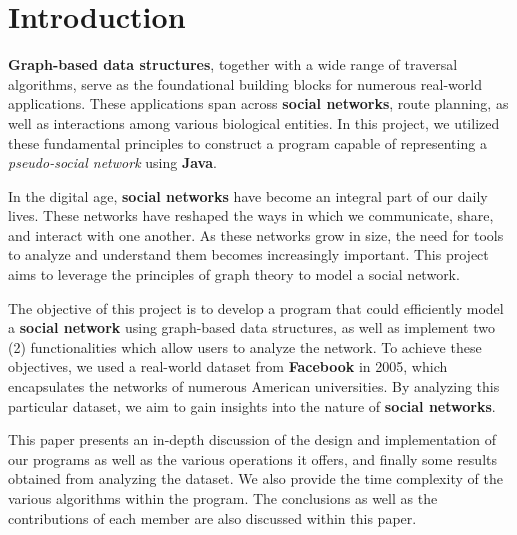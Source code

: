 \section*{\textbf{Introduction}}

\textbf{Graph-based data structures}, together with a wide range of traversal algorithms, serve as the foundational building blocks for numerous real-world applications. These applications span across \textbf{social networks}, route planning, as well as interactions among various biological entities. In this project, we utilized these fundamental principles to construct a program capable of representing a \textit{pseudo-social network} using \textbf{Java}.

In the digital age, \textbf{social networks} have become an integral part of our daily lives. These networks have reshaped the ways in which we communicate, share, and interact with one another. As these networks grow in size, the need for tools to analyze and understand them becomes increasingly important. This project aims to leverage the principles of graph theory to model a social network.

The objective of this project is to develop a program that could efficiently model a \textbf{social network} using graph-based data structures, as well as implement two (2) functionalities which allow users to analyze the network. To achieve these objectives, we used a real-world dataset from \textbf{Facebook} in 2005, which encapsulates the networks of numerous American universities. By analyzing this particular dataset, we aim to gain insights into the nature of \textbf{social networks}.

This paper presents an in-depth discussion of the design and implementation of our programs as well as the various operations it offers, and finally some results obtained from analyzing the dataset. We also provide the time complexity of the various algorithms within the program. The conclusions as well as the contributions of each member are also discussed within this paper.
